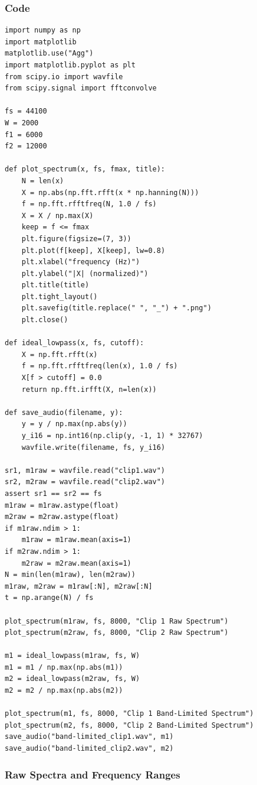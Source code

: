 \documentclass[11pt,a4paper]{article}
\begin{document}
\subsubsection{Code}
\begin{lstlisting}
import numpy as np
import matplotlib
matplotlib.use("Agg")
import matplotlib.pyplot as plt
from scipy.io import wavfile
from scipy.signal import fftconvolve

fs = 44100
W = 2000
f1 = 6000
f2 = 12000

def plot_spectrum(x, fs, fmax, title):
    N = len(x)
    X = np.abs(np.fft.rfft(x * np.hanning(N)))
    f = np.fft.rfftfreq(N, 1.0 / fs)
    X = X / np.max(X)
    keep = f <= fmax
    plt.figure(figsize=(7, 3))
    plt.plot(f[keep], X[keep], lw=0.8)
    plt.xlabel("frequency (Hz)")
    plt.ylabel("|X| (normalized)")
    plt.title(title)
    plt.tight_layout()
    plt.savefig(title.replace(" ", "_") + ".png")
    plt.close()

def ideal_lowpass(x, fs, cutoff):
    X = np.fft.rfft(x)
    f = np.fft.rfftfreq(len(x), 1.0 / fs)
    X[f > cutoff] = 0.0
    return np.fft.irfft(X, n=len(x))

def save_audio(filename, y):
    y = y / np.max(np.abs(y))
    y_i16 = np.int16(np.clip(y, -1, 1) * 32767)
    wavfile.write(filename, fs, y_i16)

sr1, m1raw = wavfile.read("clip1.wav")
sr2, m2raw = wavfile.read("clip2.wav")
assert sr1 == sr2 == fs
m1raw = m1raw.astype(float)
m2raw = m2raw.astype(float)
if m1raw.ndim > 1:
    m1raw = m1raw.mean(axis=1)
if m2raw.ndim > 1:
    m2raw = m2raw.mean(axis=1)
N = min(len(m1raw), len(m2raw))
m1raw, m2raw = m1raw[:N], m2raw[:N]
t = np.arange(N) / fs

plot_spectrum(m1raw, fs, 8000, "Clip 1 Raw Spectrum")
plot_spectrum(m2raw, fs, 8000, "Clip 2 Raw Spectrum")

m1 = ideal_lowpass(m1raw, fs, W)
m1 = m1 / np.max(np.abs(m1))
m2 = ideal_lowpass(m2raw, fs, W)
m2 = m2 / np.max(np.abs(m2))

plot_spectrum(m1, fs, 8000, "Clip 1 Band-Limited Spectrum")
plot_spectrum(m2, fs, 8000, "Clip 2 Band-Limited Spectrum")
save_audio("band-limited_clip1.wav", m1)
save_audio("band-limited_clip2.wav", m2)
\end{lstlisting}

\subsubsection{Raw Spectra and Frequency Ranges}
\end{document}

